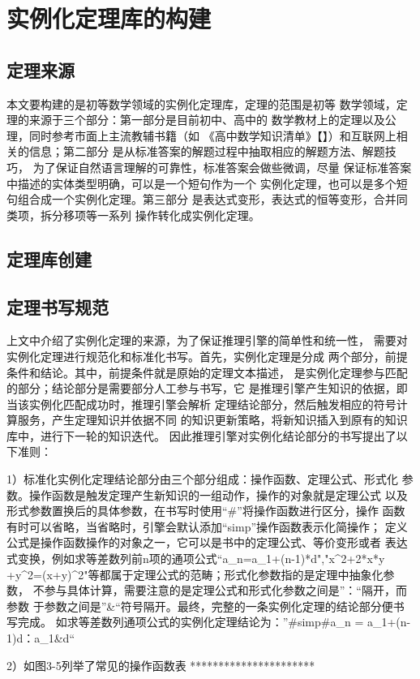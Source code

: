 \documentclass{standalone}
\begin{document}
\section{实例化定理库的构建}
\subsection{定理来源}
本文要构建的是初等数学领域的实例化定理库，定理的范围是初等
数学领域，定理的来源于三个部分：第一部分是目前初中、高中的
数学教材上的定理以及公理，同时参考市面上主流教辅书籍（如
《高中数学知识清单》【】）和互联网上相关的信息；第二部分
是从标准答案的解题过程中抽取相应的解题方法、解题技巧，
为了保证自然语言理解的可靠性，标准答案会做些微调，尽量
保证标准答案中描述的实体类型明确，可以是一个短句作为一个
实例化定理，也可以是多个短句组合成一个实例化定理。第三部分
是表达式变形，表达式的恒等变形，合并同类项，拆分移项等一系列
操作转化成实例化定理。
\subsection{定理库创建}
\subsection{定理书写规范}
上文中介绍了实例化定理的来源，为了保证推理引擎的简单性和统一性，
需要对实例化定理进行规范化和标准化书写。首先，实例化定理是分成
两个部分，前提条件和结论。其中，前提条件就是原始的定理文本描述，
是实例化定理参与匹配的部分；结论部分是需要部分人工参与书写，它
是推理引擎产生知识的依据，即当该实例化匹配成功时，推理引擎会解析
定理结论部分，然后触发相应的符号计算服务，产生定理知识并依据不同
的知识更新策略，将新知识插入到原有的知识库中，进行下一轮的知识迭代。
因此推理引擎对实例化结论部分的书写提出了以下准则：

1）标准化实例化定理结论部分由三个部分组成：操作函数、定理公式、形式化
参数。操作函数是触发定理产生新知识的一组动作，操作的对象就是定理公式
以及形式参数置换后的具体参数，在书写时使用“#”将操作函数进行区分，操作
函数有时可以省略，当省略时，引擎会默认添加“simp”操作函数表示化简操作；
定义公式是操作函数操作的对象之一，它可以是书中的定理公式、等价变形或者
表达式变换，例如求等差数列前n项的通项公式“a_n=a_1+(n-1)*d","x^2+2*x*y
+y^2=(x+y)^2"等都属于定理公式的范畴；形式化参数指的是定理中抽象化参数，
不参与具体计算，需要注意的是定理公式和形式化参数之间是”：“隔开，而参数
于参数之间是”&“符号隔开。最终，完整的一条实例化定理的结论部分便书写完成。
如求等差数列通项公式的实例化定理结论为：”#simp#a_n = a_1+(n-1)d：a_1&d“

2）如图3-5列举了常见的操作函数表
**********************
\end{document}
